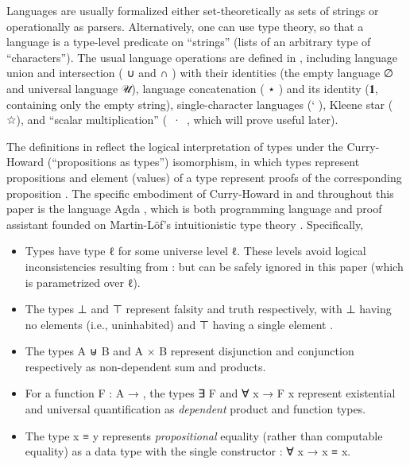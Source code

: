 \documentclass[acmsmall,screen,anonymous,timestamp]{acmart}
\begin{document}
Languages are usually formalized either set-theoretically as sets of strings or operationally as parsers.
Alternatively, one can use type theory, so that a language is a type-level predicate on ``strings'' (lists of an arbitrary type  of ``characters'').
The usual language operations are defined in , including language union and intersection ({ \AF ∪ } and { \AF ∩ }) with their identities (the empty language \AF ∅ and universal language \AF 𝒰), language concatenation ({ \AF ⋆ }) and its identity (\AF 𝟏, containing only the empty string), single-character languages ({\AF ` }), Kleene star ({ \AF ☆}), and ``scalar multiplication'' (\mbox{ \AF · }, which will prove useful later).

The definitions in  reflect the logical interpretation of types under the Curry-Howard (``propositions as types'') isomorphism, in which types represent propositions and element (values) of a type represent proofs of the corresponding proposition \citep{Wadler2015propositions}.
The specific embodiment of Curry-Howard in  and throughout this paper is the language Agda \citep{Norell2008AFP, BoveEtAl2009Agda}, which is both programming language and proof assistant founded on Martin-Löf's intuitionistic type theory \citep{MartinLöf1984intuitionistic}.
Specifically,
\begin{itemize}

\item Types have type { \AB ℓ} for some universe level \AB ℓ.
These levels avoid logical inconsistencies resulting from { \AS : } but can be safely ignored in this paper (which is parametrized over \AB ℓ).

\item The types \AD ⊥ and \ARe ⊤ represent falsity and truth respectively, with \AD ⊥ having no elements (i.e., uninhabited) and \ARe ⊤ having a single element .

\item The types {\AB A \AD ⊎ \AB B} and {\AB A \ARe × \AB B} represent disjunction and conjunction respectively as non-dependent sum and products.

\item For a function {\AB F \AS : \AB A \AS →  }, the types {\AF ∃ \AB F}  and {\AF ∀ \AB x \AS → \AB F \AB x} represent existential and universal quantification as \emph{dependent} product and function types.

\item The type {\AB x \AD ≡ \AB y} represents \emph{propositional} equality (rather than computable equality) as a data type with the single constructor { \AS : \AS ∀ \AB x \AS → \AB x \AD ≡ \AB x}.

\end{itemize}
\end{document}
